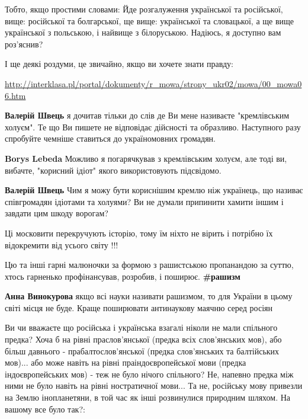 \begin{itemize}
\begin{itemize}
\begin{itemize}
Тобто, якщо простими словами: Йде розгалуження української та російської, вище:
російської та болгарської, ще вище: української та словацької, а ще вище
української з польською, і найвище з білоруською. Надіюсь, я доступно вам
роз'яснив?

І ще деякі роздуми, це звичайно, якщо ви хочете знати правду:

\url{http://interklasa.pl/portal/dokumenty/r_mowa/strony_ukr02/mowa/00_mowa06.htm}

\textbf{Валерій Швець} я дочитав тільки до слів де Ви мене називаєте "кремлівським холуєм".
Те що Ви пишете не відповідає дійсності та образливо. Наступного разу спробуйте чемніше ставиться до україномовних громадян.

\textbf{Borys Lebeda} Можливо я погарячкував з кремлівським холуєм, але тоді ви, вибачте, "корисний ідіот" якого використовують підсвідомо.

\textbf{Валерій Швець} Чим я можу бути кориснішим кремлю ніж українець, що називає співгромадян ідіотами та холуями?
Ви не думали припинити хамити іншим і завдати цим шкоду ворогам?

\end{itemize} %

\end{itemize} %

Ці московити перекручують історію, тому їм ніхто не вірить і потрібно їх відокремити від усього світу !!!


Цю та інші гарні малюночки за формою з рашистською пропанандою за суттю, хтось
гарненько профінансував, розробив, і поширює.  \textbf{\#рашизм}

\begin{itemize} %
\textbf{Анна Винокурова} якщо всі науки називати рашизмом, то для України в цьому світі місця не буде. Краще поширювати антинаукову маячню серед росіян
\end{itemize} %


Ви чи вважаєте що російська і українська взагалі ніколи не мали спільного
предка? Хоча б на рівні праслов'янської (предка всіх слов'янських мов), або
більш давнього - прабалтослов'янської (предка слов'янських та балтійських
мов)... або може навіть на рівні праіндоєвропейської мови (предка
індоєвропейських мов) - теж не було нічого спільного? Не, напевно предка між
ними не було навіть на рівні ностратичної мови... Та не, російську мову
привезли на Землю інопланетяни, в той час як інші розвинулися природним шляхом.
На вашому все було так?:


\end{itemize}

